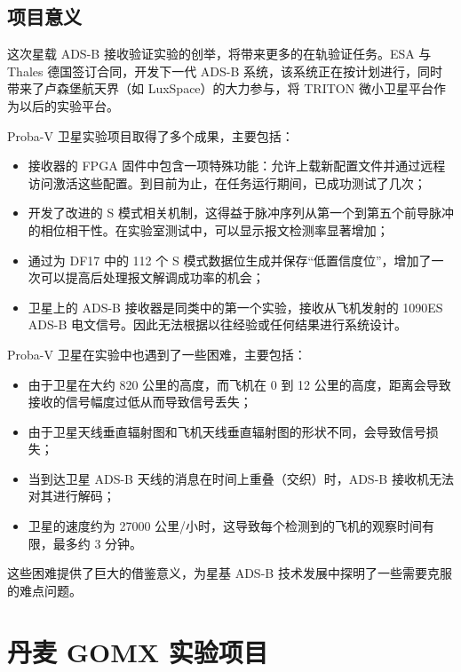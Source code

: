 \subsection{项目意义}

这次星载 ADS-B 接收验证实验的创举，将带来更多的在轨验证任务。ESA 与 Thales 德国签订合同，开发下一代 ADS-B 系统，该系统正在按计划进行，同时带来了卢森堡航天界（如 LuxSpace）的大力参与，将 TRITON 微小卫星平台作为以后的实验平台。

Proba-V 卫星实验项目取得了多个成果，主要包括：

\begin{itemize}
    \item 接收器的 \acs{FPGA} 固件中包含一项特殊功能：允许上载新配置文件并通过远程访问激活这些配置。到目前为止，在任务运行期间，已成功测试了几次；

    \item 开发了改进的 S 模式相关机制，这得益于脉冲序列从第一个到第五个前导脉冲的相位相干性。在实验室测试中，可以显示报文检测率显著增加；

    \item 通过为 DF17 中的 112 个 S 模式数据位生成并保存“低置信度位”，增加了一次可以提高后处理报文解调成功率的机会；

    \item 卫星上的 ADS-B 接收器是同类中的第一个实验，接收从飞机发射的 1090ES ADS-B 电文信号。因此无法根据以往经验或任何结果进行系统设计。
\end{itemize}

Proba-V 卫星在实验中也遇到了一些困难，主要包括：

\begin{itemize}
    \item 由于卫星在大约 820 公里的高度，而飞机在 0 到 12 公里的高度，距离会导致接收的信号幅度过低从而导致信号丢失；

    \item 由于卫星天线垂直辐射图和飞机天线垂直辐射图的形状不同，会导致信号损失；

    \item 当到达卫星 ADS-B 天线的消息在时间上重叠（交织）时，ADS-B 接收机无法对其进行解码；

    \item 卫星的速度约为 27000 公里/小时，这导致每个检测到的飞机的观察时间有限，最多约 3 分钟。
\end{itemize}

这些困难提供了巨大的借鉴意义，为星基 ADS-B 技术发展中探明了一些需要克服的难点问题。

\section{丹麦 GOMX 实验项目}

